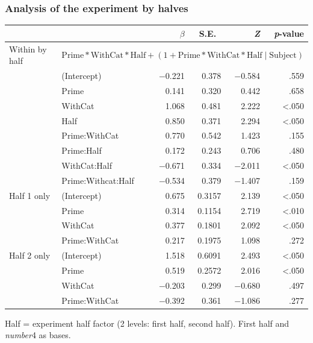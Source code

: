 \documentclass[noamssymb]{beamer}
\begin{document}
\begin{frame}
  \frametitle{{\ftf Analysis of the experiment by halves}}

  \begin{adjustbox}{width=1\textwidth,center=\textwidth}
    \begin{tabular}{llrrrr}
      \hline
      & & \(\beta\) & S.E.\ & \emph{Z} & \emph{p}-value  \\
      \hline
      Within by half & \multicolumn{5}{l}{\(\text{Prime} * \text{WithCat} * \text{Half} + (1 + \text{Prime} * \text{WithCat} * \text{Half} \mid \text{Subject})\)}  \\
      & (Intercept)        & \(-\)0.221 & 0.378 & \(-\)0.584 & .559 \\
      & Prime              &  0.141 & 0.320 &  0.442 & .658 \\
      & WithCat            &  1.068 & 0.481 &  2.222 & <.050 \\
      & Half               &  0.850 & 0.371 &  2.294 & <.050 \\
      & Prime:WithCat      &  0.770 & 0.542 &  1.423 & .155 \\
      & Prime:Half         &  0.172 & 0.243 &  0.706 & .480 \\
      & WithCat:Half       & \(-\)0.671 & 0.334 & \(-\)2.011 & <.050 \\
      & Prime:Withcat:Half & \(-\)0.534 & 0.379 & \(-\)1.407 & .159 \\
      Half 1 only & (Intercept)   & 0.675 & 0.3157 & 2.139 & <.050 \\
      & Prime         & 0.314 & 0.1154 & 2.719 & <.010 \\
      & WithCat       & 0.377 & 0.1801 & 2.092 & <.050 \\
      & Prime:WithCat & 0.217 & 0.1975 & 1.098 & .272 \\
      Half 2 only & (Intercept)   & 1.518 & 0.6091 & 2.493 & <.050 \\
      & Prime         & 0.519 & 0.2572 & 2.016 & <.050 \\
      & WithCat       & \(-\)0.203& 0.299 & \(-\)0.680& .497 \\
      & Prime:WithCat & \(-\)0.392& 0.361 & \(-\)1.086& .277 \\
      \hline
    \end{tabular}
  \end{adjustbox}
 {\small Half = experiment half factor (2 levels: first half, second half). First half and \emph{number}4 as bases.}
\end{frame}
\end{document}
